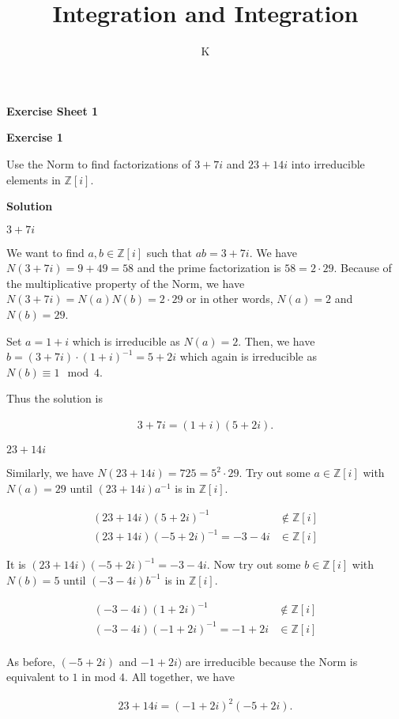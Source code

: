 \documentclass[a4paper]{article}
\title{Integration and Integration}
\author{K}
\theoremstyle{definition}
\begin{document}
\begin{center}
    \noindent\textbf{Exercise Sheet 1}
\end{center}
\noindent\textbf{Exercise 1}

Use the Norm to find factorizations of \(3 + 7i\) and \(23 + 14i\) into irreducible elements in \(\mathbb{Z}[i]\).

\noindent\textbf{Solution}

\noindent\underline{\(3 + 7i\)}

We want to find \(a, b \in \mathbb{Z}[i]\) such that \(ab = 3 + 7i\). We have \(N(3 + 7i) = 9 + 49 = 58\) and the prime factorization is \(58 = 2 \cdot 29\). Because of the multiplicative property of the Norm, we have \(N(3 + 7i) = N(a)N(b) = 2 \cdot 29\) or in other words, \(N(a) = 2\) and \(N(b) = 29\).

Set \(a = 1 + i\) which is irreducible as \(N(a) = 2\). Then, we have \(b = (3 + 7i) \cdot (1 + i)^{-1} = 5 + 2i\) which again is irreducible as \(N(b) \equiv 1 \mod{4}\).

Thus the solution is

\begin{align}
    3 + 7i = (1 + i) (5 + 2i) \text{.}
\end{align}

\noindent\underline{\(23 + 14i\)}

Similarly, we have \(N(23 + 14i) = 725 = 5^2 \cdot 29\). Try out some \(a \in \mathbb{Z}[i]\) with \(N(a) = 29\) until \((23 + 14i)a^{-1}\) is in \(\mathbb{Z}[i]\).

\begin{align}
    (23 + 14i)(5 + 2i)^{-1} &\notin \mathbb{Z}[i] \\
    (23 + 14i)(-5 + 2i)^{-1} = -3-4i &\in \mathbb{Z}[i]
\end{align}

It is \((23 + 14i)(-5+2i)^{-1} = -3-4i\). Now try out some \(b \in \mathbb{Z}[i]\) with \(N(b) = 5\) until \((-3-4i)b^{-1}\) is in \(\mathbb{Z}[i]\).

\begin{align}
    (-3 -4i)(1 + 2i)^{-1} &\notin \mathbb{Z}[i] \\
    (-3 -4i)(-1 + 2i)^{-1} = -1 + 2i&\in \mathbb{Z}[i] \\
\end{align}

As before, \((-5 + 2i)\) and \(-1 + 2i)\) are irreducible because the Norm is equivalent to \(1\) in mod \(4\). All together, we have

\begin{align}
    23 + 14i = (-1 + 2i)^2 (-5 + 2i) \text{.}
\end{align}
\end{document}
